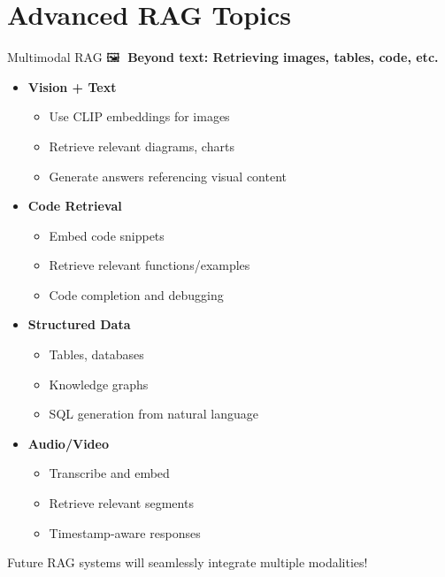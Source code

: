 \documentclass[aspectratio=169]{beamer}
\begin{document}
\section{Advanced RAG Topics}

\begin{frame}[shrink=10]{Multimodal RAG 🖼️📄}
\textbf{Beyond text: Retrieving images, tables, code, etc.}

\vspace{0.5em}

\begin{itemize}\setlength{\itemsep}{0pt}
    \item \textbf{Vision + Text}
    \begin{itemize}\setlength{\itemsep}{0pt}
        \item Use CLIP embeddings for images
        \item Retrieve relevant diagrams, charts
        \item Generate answers referencing visual content
    \end{itemize}

    \item \textbf{Code Retrieval}
    \begin{itemize}\setlength{\itemsep}{0pt}
        \item Embed code snippets
        \item Retrieve relevant functions/examples
        \item Code completion and debugging
    \end{itemize}

    \item \textbf{Structured Data}
    \begin{itemize}\setlength{\itemsep}{0pt}
        \item Tables, databases
        \item Knowledge graphs
        \item SQL generation from natural language
    \end{itemize}

    \item \textbf{Audio/Video}
    \begin{itemize}\setlength{\itemsep}{0pt}
        \item Transcribe and embed
        \item Retrieve relevant segments
        \item Timestamp-aware responses
    \end{itemize}
\end{itemize}

\vspace{0.5em}

\begin{thinkbox}
Future RAG systems will seamlessly integrate multiple modalities!
\end{thinkbox}
\end{frame}
\end{document}
